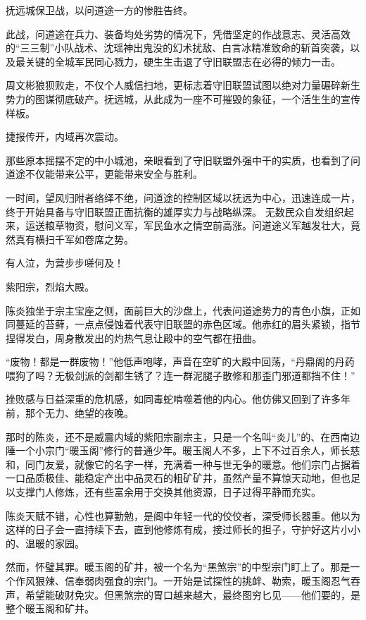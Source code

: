 \vspace{2em}

抚远城保卫战，以问道途一方的惨胜告终。

此战，问道途在兵力、装备均处劣势的情况下，凭借坚定的作战意志、灵活高效的“三三制”小队战术、沈瑶神出鬼没的幻术扰敌、白言冰精准致命的斩首突袭，以及最关键的全城军民同心戮力，硬生生击退了守旧联盟志在必得的倾力一击。

周文彬狼狈败走，不仅个人威信扫地，更标志着守旧联盟试图以绝对力量碾碎新生势力的图谋彻底破产。抚远城，从此成为一座不可摧毁的象征，一个活生生的宣传样板。

捷报传开，内域再次震动。

那些原本摇摆不定的中小城池，亲眼看到了守旧联盟外强中干的实质，也看到了问道途不仅能带来公平，更能带来安全与胜利。

一时间，望风归附者络绎不绝，问道途的控制区域以抚远为中心，迅速连成一片，终于开始具备与守旧联盟正面抗衡的雄厚实力与战略纵深。 无数民众自发组织起来，运送粮草物资，慰问义军，军民鱼水之情空前高涨。问道途义军越发壮大，竟然真有横扫千军如卷席之势。

有人泣，为营步步嗟何及！

\vspace{2em}

紫阳宗，烈焰大殿。

陈炎独坐于宗主宝座之侧，面前巨大的沙盘上，代表问道途势力的青色小旗，正如同蔓延的苔藓，一点点侵蚀着代表守旧联盟的赤色区域。他赤红的眉头紧锁，指节捏得发白，周身散发出的灼热气息让殿中的空气都在扭曲。

“废物！都是一群废物！”他低声咆哮，声音在空旷的大殿中回荡，“丹鼎阁的丹药喂狗了吗？无极剑派的剑都生锈了？连一群泥腿子散修和那歪门邪道都挡不住！”

挫败感与日益深重的危机感，如同毒蛇啃噬着他的内心。他仿佛又回到了许多年前，那个无力、绝望的夜晚。

\vspace{2em}

那时的陈炎，还不是威震内域的紫阳宗副宗主，只是一个名叫“炎儿”的、在西南边陲一个小宗门“暖玉阁”修行的普通少年。暖玉阁人不多，上下不过百余人，师长慈和，同门友爱，就像它的名字一样，充满着一种与世无争的暖意。他们宗门占据着一口品质极佳、能稳定产出中品灵石的粗矿矿井，虽然产量不算惊天动地，但也足以支撑门人修炼，还有些富余用于交换其他资源，日子过得平静而充实。

陈炎天赋不错，心性也算勤勉，是阁中年轻一代的佼佼者，深受师长器重。他以为这样的日子会一直持续下去，直到他修炼有成，接过师长的担子，守护好这片小小的、温暖的家园。

然而，怀璧其罪。暖玉阁的矿井，被一个名为“黑煞宗”的中型宗门盯上了。那是一个作风狠辣、信奉弱肉强食的宗门。一开始是试探性的挑衅、勒索，暖玉阁忍气吞声，希望能破财免灾。但黑煞宗的胃口越来越大，最终图穷匕见——他们要的，是整个暖玉阁和矿井。

